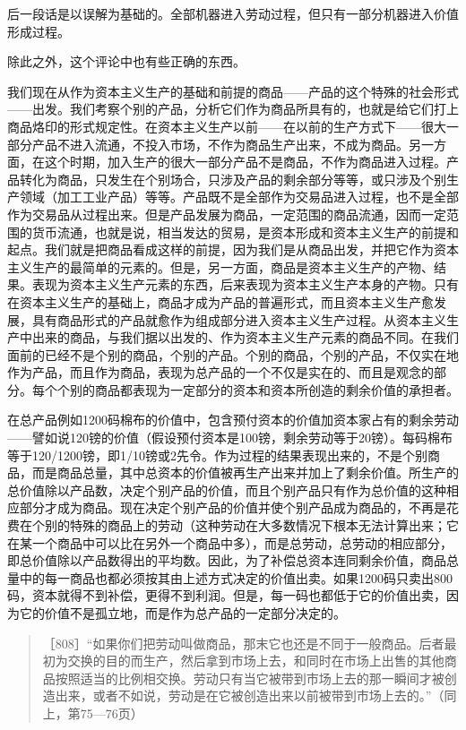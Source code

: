后一段话是以误解为基础的。全部机器进入劳动过程，但只有一部分机器进入价值形成过程。

除此之外，这个评论中也有些正确的东西。

我们现在从作为资本主义生产的基础和前提的商品——产品的这个特殊的社会形式——出发。我们考察个别的产品，分析它们作为商品所具有的，也就是给它们打上商品烙印的形式规定性。在资本主义生产以前——在以前的生产方式下——很大一部分产品不进入流通，不投入市场，不作为商品生产出来，不成为商品。另一方面，在这个时期，加入生产的很大一部分产品不是商品，不作为商品进入过程。产品转化为商品，只发生在个别场合，只涉及产品的剩余部分等等，或只涉及个别生产领域（加工工业产品）等等。产品既不是全部作为交易品进入过程，也不是全部作为交易品从过程出来。但是产品发展为商品，一定范围的商品流通，因而一定范围的货币流通，也就是说，相当发达的贸易，是资本形成和资本主义生产的前提和起点。我们就是把商品看成这样的前提，因为我们是从商品出发，并把它作为资本主义生产的最简单的元素的。但是，另一方面，商品是资本主义生产的产物、结果。表现为资本主义生产元素的东西，后来表现为资本主义生产本身的产物。只有在资本主义生产的基础上，商品才成为产品的普遍形式，而且资本主义生产愈发展，具有商品形式的产品就愈作为组成部分进入资本主义生产过程。从资本主义生产中出来的商品，与我们据以出发的、作为资本主义生产元素的商品不同。在我们面前的已经不是个别的商品，个别的产品。个别的商品，个别的产品，不仅实在地作为产品，而且作为商品，表现为总产品的一个不仅是实在的、而且是观念的部分。每个个别的商品都表现为一定部分的资本和资本所创造的剩余价值的承担者。

在总产品例如1200码棉布的价值中，包含预付资本的价值加资本家占有的剩余劳动——譬如说120镑的价值（假设预付资本是100镑，剩余劳动等于20镑）。每码棉布等于120/1200镑，即1/10镑或2先令。作为过程的结果表现出来的，不是个别商品，而是商品总量，其中总资本的价值被再生产出来并加上了剩余价值。所生产的总价值除以产品数，决定个别产品的价值，而且个别产品只有作为总价值的这种相应部分才成为商品。现在决定个别产品的价值并使个别产品成为商品的，不再是花费在个别的特殊的商品上的劳动（这种劳动在大多数情况下根本无法计算出来；它在某一个商品中可以比在另外一个商品中多），而是总劳动，总劳动的相应部分，即总价值除以产品数得出的平均数。因此，为了补偿总资本连同剩余价值，商品总量中的每一商品也都必须按其由上述方式决定的价值出卖。如果1200码只卖出800码，资本就得不到补偿，更得不到利润。但是，每一码也都低于它的价值出卖，因为它的价值不是孤立地，而是作为总产品的一定部分决定的。

\begin{quote}{［808］“如果你们把劳动叫做商品，那末它也还是不同于一般商品。后者最初为交换的目的而生产，然后拿到市场上去，和同时在市场上出售的其他商品按照适当的比例相交换。劳动只有当它被带到市场上去的那一瞬间才被创造出来，或者不如说，劳动是在它被创造出来以前被带到市场上去的。”（同上，第75—76页）}\end{quote}

